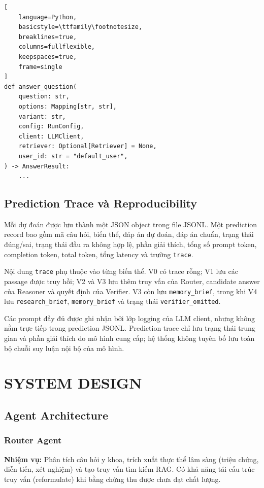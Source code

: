 \begin{lstlisting}[
    language=Python,
    basicstyle=\ttfamily\footnotesize,
    breaklines=true,
    columns=fullflexible,
    keepspaces=true,
    frame=single
]
def answer_question(
    question: str,
    options: Mapping[str, str],
    variant: str,
    config: RunConfig,
    client: LLMClient,
    retriever: Optional[Retriever] = None,
    user_id: str = "default_user",
) -> AnswerResult:
    ...
\end{lstlisting}


\subsection{Prediction Trace và Reproducibility}

Mỗi dự đoán được lưu thành một JSON object trong file JSONL. Một
prediction record bao gồm mã câu hỏi, biến thể, đáp án dự đoán, đáp
án chuẩn, trạng thái đúng/sai, trạng thái đầu ra không hợp lệ, phần
giải thích, tổng số prompt token, completion token, total token,
tổng latency và trường \texttt{trace}.

Nội dung \texttt{trace} phụ thuộc vào từng biến thể. V0 có trace
rỗng; V1 lưu các passage được truy hồi; V2 và V3 lưu thêm truy vấn
của Router, candidate answer của Reasoner và quyết định của
Verifier. V3 còn lưu \texttt{memory\_brief}, trong khi V4 lưu
\texttt{research\_brief}, \texttt{memory\_brief} và trạng thái
\texttt{verifier\_omitted}.

Các prompt đầy đủ được ghi nhận bởi lớp logging của LLM client,
nhưng không nằm trực tiếp trong prediction JSONL. Prediction trace
chỉ lưu trạng thái trung gian và phần giải thích do mô hình cung
cấp; hệ thống không tuyên bố lưu toàn bộ chuỗi suy luận nội bộ của
mô hình.
\section{SYSTEM DESIGN}

\subsection{Agent Architecture}
\subsubsection{Router Agent}
\textbf{Nhiệm vụ:} Phân tích câu hỏi y khoa, trích xuất thực thể lâm sàng (triệu chứng, diễn tiến, xét nghiệm) và tạo truy vấn tìm kiếm RAG. Có khả năng tái cấu trúc truy vấn (reformulate) khi bằng chứng thu được chưa đạt chất lượng.

